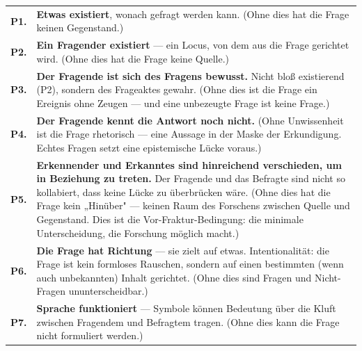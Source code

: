 \documentclass[10pt, openany, oneside]{book}
\renewcommand{\footnotesize}{\fontsize{8.5}{11}\selectfont}
\begin{document}
{\footnotesize
\noindent\begin{tabular}{r p{}}
\textbf{P1.} & \textbf{Etwas existiert}, wonach gefragt werden kann. (Ohne dies hat die Frage keinen Gegenstand.) \\[0.3em]
\textbf{P2.} & \textbf{Ein Fragender existiert} --- ein Locus, von dem aus die Frage gerichtet wird. (Ohne dies hat die Frage keine Quelle.) \\[0.3em]
\textbf{P3.} & \textbf{Der Fragende ist sich des Fragens bewusst.} Nicht bloß existierend (P2), sondern des Frageaktes gewahr. (Ohne dies ist die Frage ein Ereignis ohne Zeugen --- und eine unbezeugte Frage ist keine Frage.) \\[0.3em]
\textbf{P4.} & \textbf{Der Fragende kennt die Antwort noch nicht.} (Ohne Unwissenheit ist die Frage rhetorisch --- eine Aussage in der Maske der Erkundigung. Echtes Fragen setzt eine epistemische Lücke voraus.) \\[0.3em]
\textbf{P5.} & \textbf{Erkennender und Erkanntes sind hinreichend verschieden, um in Beziehung zu treten.} Der Fragende und das Befragte sind nicht so kollabiert, dass keine Lücke zu überbrücken wäre. (Ohne dies hat die Frage kein „Hinüber" --- keinen Raum des Forschens zwischen Quelle und Gegenstand. Dies ist die Vor-Fraktur-Bedingung: die minimale Unterscheidung, die Forschung möglich macht.) \\[0.3em]
\textbf{P6.} & \textbf{Die Frage hat Richtung} --- sie zielt auf etwas. Intentionalität: die Frage ist kein formloses Rauschen, sondern auf einen bestimmten (wenn auch unbekannten) Inhalt gerichtet. (Ohne dies sind Fragen und Nicht-Fragen ununterscheidbar.) \\[0.3em]
\textbf{P7.} & \textbf{Sprache funktioniert} --- Symbole können Bedeutung über die Kluft zwischen Fragendem und Befragtem tragen. (Ohne dies kann die Frage nicht formuliert werden.) \\[0.3em]
\end{tabular}
}
\end{document}
